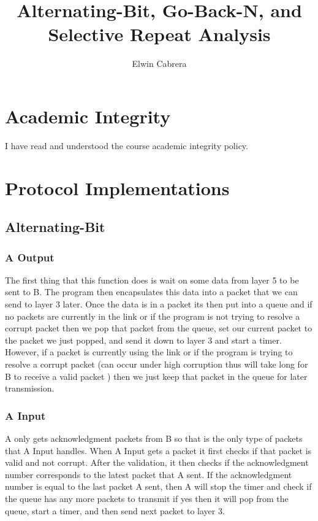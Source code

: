 \documentclass[10pt, a4paper]{article}
\author{Elwin Cabrera}
\title{Alternating-Bit, Go-Back-N, and Selective Repeat Analysis}
\begin{document}

\maketitle
\newpage

\tableofcontents
\newpage

\listoffigures
\newpage


\section{Academic Integrity}
    I have read and understood the course academic integrity policy.
\section{Protocol Implementations}
    
  \subsection{Alternating-Bit}
    \subsubsection{A Output\label{abt-aout}}
        The first thing that this function does is wait on some data from layer 5 to be sent to B. The program then encapsulates
this data into a packet that we can send to layer 3 later. Once the data is in a packet its then put into a queue and if no packets are currently in the link or if the program is not trying to resolve a corrupt packet then we pop that packet from the queue, set our current packet to the packet we just popped, and send it down to layer 3 and start a timer. However, if a packet is currently using the link or if the program is trying to resolve a corrupt packet (can occur under high corruption thus will take long for B to receive a valid packet ) then we just keep that packet in the queue for later transmission.  
    \subsubsection{A Input\label{abt-ain}}
        A only gets acknowledgment packets from B so that is the only type of packets that A Input handles. When A Input gets a packet it first checks if that packet is valid and not corrupt. After the validation, it then checks if the acknowledgment number corresponds to the latest packet that A sent. If the acknowledgment number is equal to the last packet A sent, then A will stop the timer and check if the queue has any more packets to transmit if yes then it will pop from the queue, start a timer,  and then send next packet to layer 3.  
\end{document}
